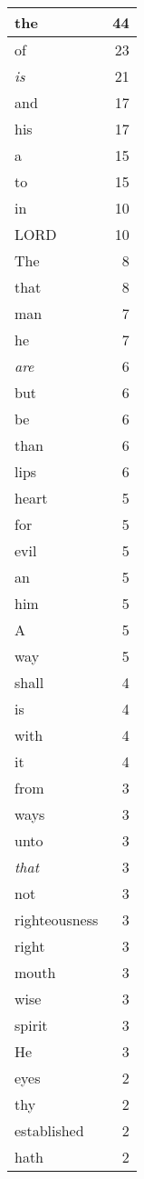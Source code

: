 \begin{center}
\begin{longtable}{l|r}
the & 44\\ \hline 
of & 23\\ \hline 
\emph{is} & 21\\ \hline 
and & 17\\ \hline 
his & 17\\ \hline 
a & 15\\ \hline 
to & 15\\ \hline 
in & 10\\ \hline 
LORD & 10\\ \hline 
The & 8\\ \hline 
that & 8\\ \hline 
man & 7\\ \hline 
he & 7\\ \hline 
\emph{are} & 6\\ \hline 
but & 6\\ \hline 
be & 6\\ \hline 
than & 6\\ \hline 
lips & 6\\ \hline 
heart & 5\\ \hline 
for & 5\\ \hline 
evil & 5\\ \hline 
an & 5\\ \hline 
him & 5\\ \hline 
A & 5\\ \hline 
way & 5\\ \hline 
shall & 4\\ \hline 
is & 4\\ \hline 
with & 4\\ \hline 
it & 4\\ \hline 
from & 3\\ \hline 
ways & 3\\ \hline 
unto & 3\\ \hline 
\emph{that} & 3\\ \hline 
not & 3\\ \hline 
righteousness & 3\\ \hline 
right & 3\\ \hline 
mouth & 3\\ \hline 
wise & 3\\ \hline 
spirit & 3\\ \hline 
He & 3\\ \hline 
eyes & 2\\ \hline 
thy & 2\\ \hline 
established & 2\\ \hline 
hath & 2\\ \hline 

\end{longtable}
\end{center}
